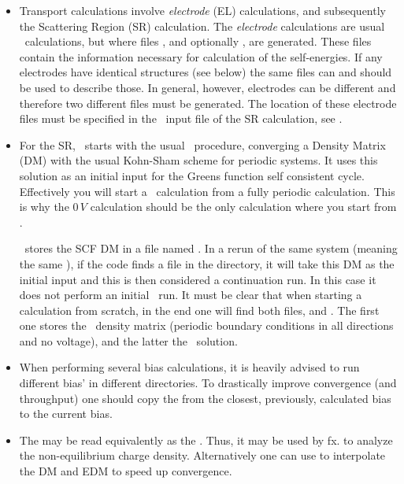 \begin{itemize}
  \item%
  Transport calculations involve \emph{electrode} (EL) calculations,
  and subsequently the Scattering Region (SR) calculation. The
  \emph{electrode} calculations are usual \siesta\ calculations, but
  where files , and optionally , are
  generated. These files contain the information necessary for
  calculation of the self-energies. If any electrodes have identical
  structures (see below) the same files can and should be used to
  describe those. In general, however, electrodes can be different and
  therefore two different  files must be generated. The
  location of these electrode files must be specified in the \fdflib\
  input file of the SR calculation, see .

  \item %
  For the SR, \tsiesta\ starts with the usual \siesta\ procedure,
  converging a Density Matrix (DM) with the usual Kohn-Sham scheme for
  periodic systems. It uses this solution as an initial input for the
  Greens function self consistent cycle. Effectively you will start a
  \tsiesta\ calculation from a fully periodic calculation. This is why
  the $0\, V$ calculation should be the only calculation where you start
  from \siesta.

  \tsiesta\ stores the SCF DM in a file named . In a rerun of
  the same system (meaning the same \fdf{SystemLabel}), if the
  code finds a \sysfile{TSDE} file in the directory, it will take this
  DM as the initial input and this is then considered a continuation
  run. In this case it does not perform an initial \siesta\ run. It
  must be clear that when starting a calculation from scratch, in the
  end one will find both files, \sysfile{DM} and \sysfile{TSDE}.
  The first one stores the \siesta\ density matrix (periodic boundary
  conditions in all directions and no voltage), and the latter the
  \tsiesta\ solution.

  \item %
  When performing several bias calculations, it is heavily advised to
  run different bias' in different directories. To drastically improve
  convergence (and throughput) one should copy the \sysfile{TSDE} from
  the closest, previously, calculated bias to the current bias.
  
  \item %
  The  may be read equivalently as the
  . Thus, it may be used by fx.  to
  analyze the non-equilibrium charge density. Alternatively one can
  use \sisl\cite{sisl} to interpolate the DM and EDM to speed up
  convergence.


\end{itemize}
